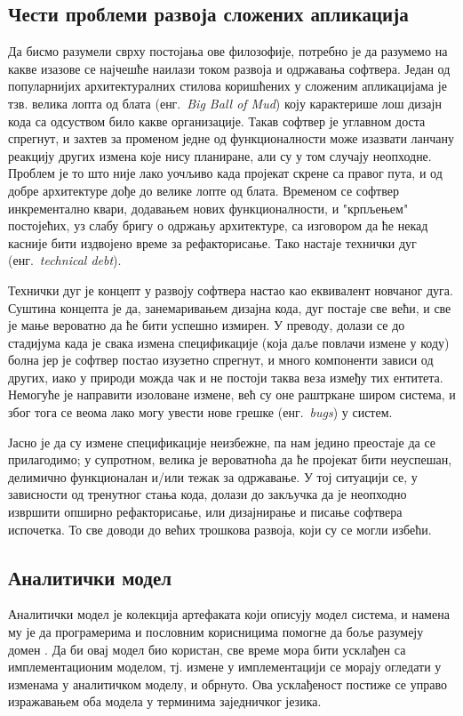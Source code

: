 \documentclass[12pt,oneside]{memoir}
\begin{document}
\subsection{Чести проблеми развоја сложених апликација}
Да бисмо разумели сврху постојања ове филозофије, потребно је да разумемо на какве изазове се најчешће наилази током развоја и одржавања софтвера. Један од популарнијих архитектуралних стилова коришћених у сложеним апликацијама је тзв. велика лопта од блата (енг.~\textit{Big Ball of Mud}) коју карактерише лош дизајн кода са одсуством било какве организације. Такав софтвер је углавном доста спрегнут, и захтев за променом једне од функционалности може изазвати ланчану реакцију других измена које нису планиране, али су у том случају неопходне. Проблем је то што није лако уочљиво када пројекат скрене са правог пута, и од добре архитектуре дође до велике лопте од блата. Временом се софтвер инкрементално квари, додавањем нових функционалности, и "крпљењем" постојећих, уз слабу бригу о одржању архитектуре, са изговором да ће некад касније бити издвојено време за рефакторисање. Тако настаје технички дуг (енг.~\textit{technical debt}).

Технички дуг је концепт у развоју софтвера настао као еквивалент новчаног дуга. Суштина концепта је да, занемаривањем дизајна кода, дуг постаје све већи, и све је мање вероватно да ће бити успешно измирен. У преводу, долази се до стадијума када је свака измена спецификације (која даље повлачи измене у коду) болна јер је софтвер постао изузетно спрегнут, и много компоненти зависи од других, иако у природи можда чак и не постоји таква веза између тих ентитета. Немогуће је направити изоловане измене, већ су оне раштркане широм система, и због тога се веома лако могу увести нове грешке (енг.~\textit{bugs}) у систем.

Јасно је да су измене спецификације неизбежне, па нам једино преостаје да се прилагодимо; у супротном, велика је вероватноћа да ће пројекат бити неуспешан, делимично функционалан и/или тежак за одржавање. У тој ситуацији се, у зависности од тренутног стања кода, долази до закључка да је неопходно извршити опширно рефакторисање, или дизајнирање и писање софтвера испочетка. То све доводи до већих трошкова развоја, који су се могли избећи.

\subsection{Аналитички модел}
Аналитички модел је колекција артефаката који описују модел система, и намена му је да програмерима и пословним корисницима помогне да боље разумеју домен \cite{DomainDrivenDessign}. Да би овај модел био користан, све време мора бити усклађен са имплементационим моделом, тј. измене у имплементацији се морају огледати у изменама у аналитичком моделу, и обрнуто. Ова усклађеност постиже се управо изражавањем оба модела у терминима заједничког језика.
\end{document}
